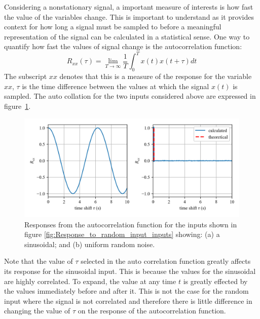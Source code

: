 \documentclass[12pt,letter]{article}
\begin{document}
Considering a nonstationary signal, a important measure of interests is how fast the value of the variables change. This is important to understand as it provides context for how long a signal must be sampled to before a meaningful representation of the signal can be calculated in a statistical sense. One way to quantify how fast the values of signal change is the autocorrelation function: 
\begin{equation}
R_{xx}(\tau) = \lim\limits_{T \rightarrow \infty} \frac{1}{T} \int_{0}^{T}x(t)x(t+\tau)dt
\end{equation}
The subscript $xx$ denotes that this is a measure of the response for the variable $xx$, $\tau$ is the time difference between the values at which the signal $x(t)$ is sampled. The auto collation for the two inputs considered above are expressed in figure~\ref{fig:Response_to_random_input_autocorrelation}.
\begin{figure}[H]
	\centering
	\includegraphics[width=1\textwidth]{../figures/Response_to_random_input_autocorrelation.png}
	\caption{Responses from the autocorrelation function for the inputs shown in figure \ref{fig:Response_to_random_input_inputs} showing: (a) a sinusoidal; and (b) uniform random noise.}
	\label{fig:Response_to_random_input_autocorrelation}
\end{figure}
\noindent Note that the value of $\tau$ selected in the auto correlation function greatly affects its response for the sinusoidal input. This is because the values for the sinusoidal are highly correlated. To expand, the value at any time $t$ is greatly effected by the values immediately before and after it. This is not the case for the random input where the signal is not correlated and therefore there is little difference in changing the value of $\tau$ on the response of the autocorrelation function.  
\end{document}

